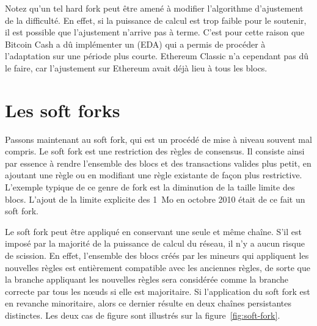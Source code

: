 Notez qu'un tel hard fork peut être amené à modifier l'algorithme d'ajustement de la difficulté. En effet, si la puissance de calcul est trop faible pour le soutenir, il est possible que l'ajustement n'arrive pas à terme. C'est pour cette raison que Bitcoin Cash a dû implémenter un  (EDA) qui a permis de procéder à l'adaptation sur une période plus courte. Ethereum Classic n'a cependant pas dû le faire, car l'ajustement sur Ethereum avait déjà lieu à tous les blocs.

\section*{Les soft forks}

Passons maintenant au soft fork, qui est un procédé de mise à niveau souvent mal compris. Le soft fork est une restriction des règles de consensus. Il consiste ainsi par essence à rendre l'ensemble des blocs et des transactions valides plus petit, en ajoutant une règle ou en modifiant une règle existante de façon plus restrictive. L'exemple typique de ce genre de fork est la diminution de la taille limite des blocs. L'ajout de la limite explicite des 1~Mo en octobre 2010 était de ce fait un soft fork.

Le soft fork peut être appliqué en conservant une seule et même chaîne. S'il est imposé par la majorité de la puissance de calcul du réseau, il n'y a aucun risque de scission. En effet, l'ensemble des blocs créés par les mineurs qui appliquent les nouvelles règles est entièrement compatible avec les anciennes règles, de sorte que la branche appliquant les nouvelles règles sera considérée comme la branche correcte par tous les nœuds si elle est majoritaire. Si l'application du soft fork est en revanche minoritaire, alors ce dernier résulte en deux chaînes persistantes distinctes. Les deux cas de figure sont illustrés sur la figure~\ref{fig:soft-fork}.

